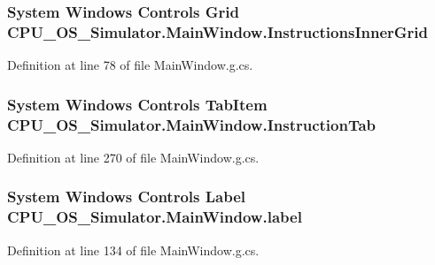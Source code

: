 \subsubsection[{Instructions\+Inner\+Grid}]{\setlength{\rightskip}{0pt plus 5cm}System Windows Controls Grid C\+P\+U\+\_\+\+O\+S\+\_\+\+Simulator.\+Main\+Window.\+Instructions\+Inner\+Grid\hspace{0.3cm}{\ttfamily [package]}}\label{class_c_p_u___o_s___simulator_1_1_main_window_a94a99eeb7f5fcfcfbdc375937d5439e7}


Definition at line 78 of file Main\+Window.\+g.\+cs.

\hypertarget{class_c_p_u___o_s___simulator_1_1_main_window_a4fe9f6d97eb1f2c45b9e5a0363e61557}{}
\subsubsection[{Instruction\+Tab}]{\setlength{\rightskip}{0pt plus 5cm}System Windows Controls Tab\+Item C\+P\+U\+\_\+\+O\+S\+\_\+\+Simulator.\+Main\+Window.\+Instruction\+Tab\hspace{0.3cm}{\ttfamily [package]}}\label{class_c_p_u___o_s___simulator_1_1_main_window_a4fe9f6d97eb1f2c45b9e5a0363e61557}


Definition at line 270 of file Main\+Window.\+g.\+cs.

\hypertarget{class_c_p_u___o_s___simulator_1_1_main_window_ad60038602dcf5d954e420bee89c8494d}{}
\subsubsection[{label}]{\setlength{\rightskip}{0pt plus 5cm}System Windows Controls Label C\+P\+U\+\_\+\+O\+S\+\_\+\+Simulator.\+Main\+Window.\+label\hspace{0.3cm}{\ttfamily [package]}}\label{class_c_p_u___o_s___simulator_1_1_main_window_ad60038602dcf5d954e420bee89c8494d}


Definition at line 134 of file Main\+Window.\+g.\+cs.

